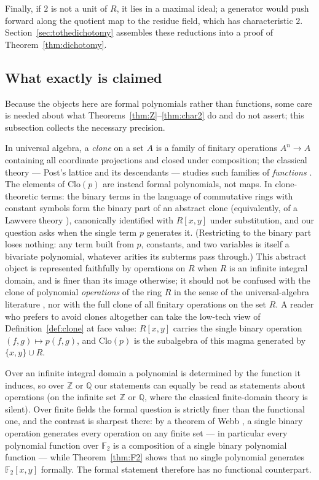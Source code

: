 \documentclass[11pt]{article}
\theoremstyle{definition}
\theoremstyle{remark}
\newcommand{\F}{\mathbb{F}}
\newcommand{\Z}{\mathbb{Z}}
\newcommand{\Q}{\mathbb{Q}}
\newcommand{\Clo}{\mathrm{Clo}}
\begin{document}
Finally, if $2$ is not a unit of $R$, it lies in a maximal ideal; a
generator would push forward along the quotient map to the
residue field, which has characteristic $2$.
Section~\ref{sec:tothedichotomy} assembles these reductions into a
proof of Theorem~\ref{thm:dichotomy}.

\subsection{What exactly is claimed}\label{sec:precision}

Because the objects here are formal polynomials rather than
functions, some care is needed about what
Theorems~\ref{thm:Z}--\ref{thm:char2} do and do not assert; this
subsection collects the necessary precision.

In universal algebra, a \emph{clone} on a set $A$ is a family of
finitary operations $A^n \to A$ containing all coordinate projections
and closed under composition; the classical theory --- Post's lattice
and its descendants --- studies such families of \emph{functions}
\cite{Post,Szendrei}.  The elements of $\Clo(p)$ are instead formal
polynomials, not maps.  In clone-theoretic terms: the binary terms in
the language of commutative rings with constant symbols form the
binary part of an abstract clone (equivalently, of a Lawvere theory
\cite{Lawvere}), canonically identified with $R[x,y]$ under
substitution, and our question asks when the single term $p$
generates it.  (Restricting to the binary part loses nothing: any
term built from $p$, constants, and two variables is itself a
bivariate polynomial, whatever arities its subterms pass through.)
This abstract object is represented faithfully by operations on $R$
when $R$ is an infinite integral domain, and is finer than its image
otherwise; it should not be confused with the clone of polynomial
\emph{operations} of the ring $R$ in the sense of the
universal-algebra literature \cite{KaarliPixley,Szendrei}, nor with
the full clone of all finitary operations on the set $R$.  A reader
who prefers to avoid clones altogether can take the low-tech view of
Definition~\ref{def:clone} at face value: $R[x,y]$ carries the single
binary operation $(f,g) \mapsto p(f,g)$, and $\Clo(p)$ is the
subalgebra of this magma generated by $\{x, y\} \cup R$.

Over an infinite integral domain a polynomial is determined by the
function it induces, so over $\Z$ or $\Q$ our statements can equally
be read as statements about operations (on the infinite set $\Z$ or
$\Q$, where the classical finite-domain theory is silent).  Over
finite fields the formal question is strictly finer than the
functional one, and the contrast is sharpest there: by a theorem of
Webb \cite{Webb}, a single binary operation generates every
operation on any finite set --- in particular every polynomial
function over $\F_2$ is a composition of a single binary polynomial
function --- while Theorem~\ref{thm:F2} shows that no single
polynomial generates $\F_2[x,y]$ formally.  The formal statement
therefore has no functional counterpart.
\end{document}

